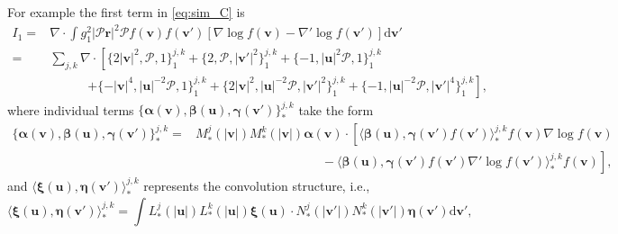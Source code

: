 \documentclass[preprint,1p,times]{elsarticle}
\theoremstyle{definition}
\theoremstyle{remark}
\begin{document}
For example the first term in \eqref{eq:sim_C} is
\begin{equation}\label{eq:sim_I1}
    \begin{aligned}
        I_{1} =& \nabla \cdot \int g_{1}^{2} |\bm{\mathcal{P}}\bm{r}|^{2} \bm{\mathcal{P}} f(\bm{v}) f(\bm{v}') \left[ \nabla \log f(\bm{v}) - \nabla'\log f(\bm{v}') \right] \mathrm{d}\bm{v}' \\
        =& \sum_{j,k} \nabla \cdot 
        \left[ \{2|\bm{v}|^2,\bm{\mathcal{P}},1\}_{1}^{j,k} 
        +\{2,\bm{\mathcal{P}},|\bm{v}'|^{2}\}_{1}^{j,k} 
        +\{-1,|\bm{u}|^{2}\bm{\mathcal{P}},1\}_{1}^{j,k} \right. \\
        &\qquad\quad \left. 
        +\{-|\bm{v}|^{4},|\bm{u}|^{-2}\bm{\mathcal{P}},1\}_{1}^{j,k} 
        +\{ 2|\bm{v}|^{2},|\bm{u}|^{-2}\bm{\mathcal{P}},|\bm{v}'|^{2}\}_{1}^{j,k} 
        +\{-1,|\bm{u}|^{-2}\bm{\mathcal{P}},|\bm{v}'|^{4}\}_{1}^{j,k} \right] ,
    \end{aligned}
\end{equation}
where individual terms $\{ \bm{\alpha}(\bm{v}),\bm{\beta}(\bm{u}),\bm{\gamma}(\bm{v}')\}_{\ast}^{j,k}$ take the form
\begin{equation}
    \begin{aligned}
        \{ \bm{\alpha}(\bm{v}),\bm{\beta}(\bm{u}),\bm{\gamma}(\bm{v}')\}_{\ast}^{j,k} =& M_{\ast}^{j}(|\bm{v}|) M_{\ast}^{k}(|\bm{v}|) \bm{\alpha}(\bm{v}) \cdot \left[ \langle\bm{\beta}(\bm{u}), \bm{\gamma}(\bm{v}')f(\bm{v}') \rangle_{\ast}^{j,k} f(\bm{v}) \nabla \log f(\bm{v}) \right.\\
        & \qquad \qquad \qquad \qquad \qquad - \left. \langle \bm{\beta}(\bm{u}), \bm{\gamma}(\bm{v}') f(\bm{v}') \nabla' \log f(\bm{v}') \rangle_{\ast}^{j,k} f(\bm{v}) \right],
    \end{aligned}
\nonumber
\end{equation}
and $\langle \bm{\xi}(\bm{u}),\bm{\eta}(\bm{v}') \rangle_{\ast}^{j,k} $ represents the convolution structure, i.e.,  
\begin{equation*}
\langle \bm{\xi}(\bm{u}),\bm{\eta}(\bm{v}') \rangle_{\ast}^{j,k} = \int  L_{\ast}^{j}(|\bm{u}|) L_{\ast}^{k}(|\bm{u}|) \bm{\xi}(\bm{u}) \cdot N_{\ast}^{j}(|\bm{v}'|) N_{\ast}^{k}(|\bm{v}'|) \bm{\eta}(\bm{v}') \mathrm{d}\bm{v}',    
\end{equation*} 
\end{document}
